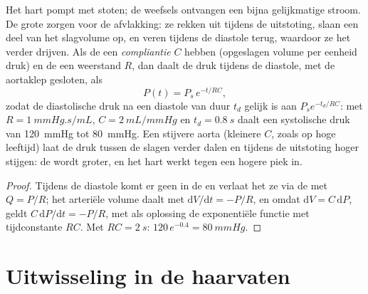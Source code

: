 \begin{theorem}\label{thm:b2:blood-circulation:windkessel}
Het hart pompt met stoten; de weefsels ontvangen een bijna gelijkmatige
stroom. De grote  zorgen voor de afvlakking: ze rekken uit tijdens
de uitstoting, slaan een deel van het slagvolume op, en veren tijdens de
diastole terug, waardoor ze het verder drijven. Als de  een
\emph{compliantie}
$C$ hebben (opgeslagen volume per eenheid druk) en de  een
weerstand $R$, dan daalt de druk tijdens de diastole, met de aortaklep
gesloten, als
\[
P(t) = P_{s}\,e^{-t/RC},
\]
zodat de diastolische druk na een diastole van duur $t_d$ gelijk is
aan $P_s e^{-t_d/RC}$: met $R = \qty{1}{mmHg.s/mL}$, $C =
\qty{2}{mL/mmHg}$ en $t_d = \qty{0.8}{s}$ daalt een systolische druk van
\qty{120}{mmHg} tot \qty{80}{mmHg}. Een stijvere aorta (kleinere
$C$, zoals op hoge leeftijd) laat de druk tussen de slagen verder dalen
en tijdens de uitstoting hoger stijgen: de \emph{} wordt groter,
en het hart werkt tegen een hogere piek in.
\end{theorem}
\begin{proof}
Tijdens de diastole komt er geen  in de  en verlaat het ze via
de  met $Q = P/R$; het arteriële volume daalt met
$\mathrm{d}V/\mathrm{d}t = -P/R$, en omdat $\mathrm{d}V = C\,
\mathrm{d}P$, geldt $C\,\mathrm{d}P/\mathrm{d}t = -P/R$, met als oplossing
de exponentiële functie met tijdconstante $RC$. Met $RC = \qty{2}{s}$:
$120\,e^{-0.4} = \qty{80}{mmHg}$.
\end{proof}

\section{Uitwisseling in de haarvaten}

